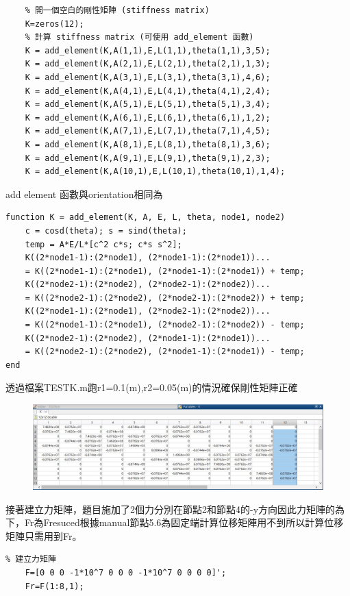 \documentclass[12pt]{article}
\begin{document}
\begin{CJK}{UTF8}{bkai}
\begin{lstlisting}   
    % 開一個空白的剛性矩陣 (stiffness matrix)
    K=zeros(12);
    % 計算 stiffness matrix (可使用 add_element 函數)
    K = add_element(K,A(1,1),E,L(1,1),theta(1,1),3,5);
    K = add_element(K,A(2,1),E,L(2,1),theta(2,1),1,3);
    K = add_element(K,A(3,1),E,L(3,1),theta(3,1),4,6);
    K = add_element(K,A(4,1),E,L(4,1),theta(4,1),2,4);
    K = add_element(K,A(5,1),E,L(5,1),theta(5,1),3,4);
    K = add_element(K,A(6,1),E,L(6,1),theta(6,1),1,2);
    K = add_element(K,A(7,1),E,L(7,1),theta(7,1),4,5);
    K = add_element(K,A(8,1),E,L(8,1),theta(8,1),3,6);
    K = add_element(K,A(9,1),E,L(9,1),theta(9,1),2,3);
    K = add_element(K,A(10,1),E,L(10,1),theta(10,1),1,4);
\end{lstlisting}
add element 函數與orientation相同為
\begin{lstlisting}
function K = add_element(K, A, E, L, theta, node1, node2)
    c = cosd(theta); s = sind(theta);
    temp = A*E/L*[c^2 c*s; c*s s^2];
    K((2*node1-1):(2*node1), (2*node1-1):(2*node1))...
    = K((2*node1-1):(2*node1), (2*node1-1):(2*node1)) + temp;
    K((2*node2-1):(2*node2), (2*node2-1):(2*node2))...
    = K((2*node2-1):(2*node2), (2*node2-1):(2*node2)) + temp;
    K((2*node1-1):(2*node1), (2*node2-1):(2*node2))...
    = K((2*node1-1):(2*node1), (2*node2-1):(2*node2)) - temp;
    K((2*node2-1):(2*node2), (2*node1-1):(2*node1))...
    = K((2*node2-1):(2*node2), (2*node1-1):(2*node1)) - temp;
end
\end{lstlisting}

透過檔案TESTK.m跑r1=0.1(m),r2=0.05(m)的情況確保剛性矩陣正確\\
\begin{figure}[h]
\includegraphics[scale=0.5]{./graph/KTEST.jpg}
\end{figure}

接著建立力矩陣，題目施加了2個力分別在節點2和節點4的-y方向因此力矩陣的為下，Fr為Fresuced根據manual節點5.6為固定端計算位移矩陣用不到所以計算位移矩陣只需用到Fr。
\begin{lstlisting}
% 建立力矩陣
	F=[0 0 0 -1*10^7 0 0 0 -1*10^7 0 0 0 0]';
    Fr=F(1:8,1);
\end{lstlisting}


\end{CJK}
\end{document}
